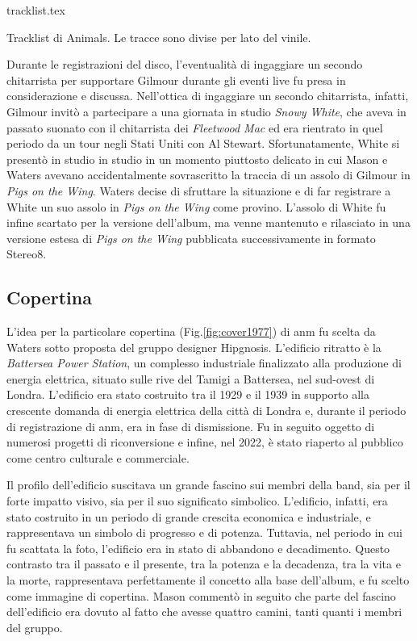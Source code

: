 \documentclass[class=book, crop=false, oneside, 12pt]{standalone}
\begin{document}
    \begin{table}[t]
        \centering
        {tracklist.tex}
        \caption{Tracklist di Animals. Le tracce sono divise per lato del vinile.}
        \label{tab:tracklist}
    \end{table}
    
    Durante le registrazioni del disco, l'eventualità di ingaggiare un secondo chitarrista per supportare Gilmour durante gli eventi live fu presa in considerazione e discussa. Nell'ottica di ingaggiare un secondo chitarrista, infatti, Gilmour invitò a partecipare a una giornata in studio \emph{Snowy White}, che aveva in passato suonato con il chitarrista dei \emph{Fleetwood Mac} ed era rientrato in quel periodo da un tour negli Stati Uniti con Al Stewart. Sfortunatamente, White si presentò in studio in studio in un momento piuttosto delicato in cui Mason e Waters avevano accidentalmente sovrascritto la traccia di un assolo di Gilmour in \emph{Pigs on the Wing}. Waters decise di sfruttare la situazione e di far registrare a White un suo assolo in \emph{Pigs on the Wing} come provino. L'assolo di White fu infine scartato per la versione dell'album, ma venne mantenuto e rilasciato in una versione estesa di \emph{Pigs on the Wing} pubblicata successivamente in formato Stereo8.
    
    \subsection{Copertina}
    L'idea per la particolare copertina (Fig.\ref{fig:cover1977}) di \acrshort{anm} fu scelta da Waters sotto proposta del gruppo designer Hipgnosis. L'edificio ritratto è la \emph{Battersea Power Station}, un complesso industriale finalizzato alla produzione di energia elettrica, situato sulle rive del Tamigi a Battersea, nel sud-ovest di Londra. L'edificio era stato costruito tra il 1929 e il 1939 in supporto alla crescente domanda di energia elettrica della città di Londra e, durante il periodo di registrazione di \acrshort{anm}, era in fase di dismissione. Fu in seguito oggetto di numerosi progetti di riconversione e infine, nel 2022, è stato riaperto al pubblico come centro culturale e commerciale.

    Il profilo dell'edificio suscitava un grande fascino sui membri della band, sia per il forte impatto visivo, sia per il suo significato simbolico. L'edificio, infatti, era stato costruito in un periodo di grande crescita economica e industriale, e rappresentava un simbolo di progresso e di potenza. Tuttavia, nel periodo in cui fu scattata la foto, l'edificio era in stato di abbandono e decadimento. Questo contrasto tra il passato e il presente, tra la potenza e la decadenza, tra la vita e la morte, rappresentava perfettamente il concetto alla base dell'album, e fu scelto come immagine di copertina. Mason commentò in seguito che parte del fascino dell'edificio era dovuto al fatto che avesse quattro camini, tanti quanti i membri del gruppo.
\end{document}
